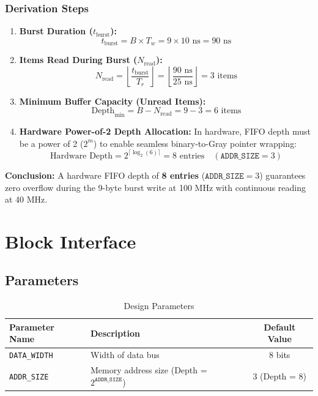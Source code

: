 \documentclass[12pt,a4paper]{article}
\begin{document}
\subsubsection{Derivation Steps}

\begin{enumerate}
    \item \textbf{Burst Duration ($t_{\text{burst}}$):}
    \[
        t_{\text{burst}} = B \times T_w = 9 \times 10\text{ ns} = 90\text{ ns}
    \]

    \item \textbf{Items Read During Burst ($N_{\text{read}}$):}
    \[
        N_{\text{read}} = \left\lfloor \frac{t_{\text{burst}}}{T_r} \right\rfloor = \left\lfloor \frac{90\text{ ns}}{25\text{ ns}} \right\rfloor = 3\text{ items}
    \]

    \item \textbf{Minimum Buffer Capacity (Unread Items):}
    \[
        \text{Depth}_{\text{min}} = B - N_{\text{read}} = 9 - 3 = 6\text{ items}
    \]

    \item \textbf{Hardware Power-of-2 Depth Allocation:}
    In hardware, FIFO depth must be a power of 2 ($2^m$) to enable seamless binary-to-Gray pointer wrapping:
    \[
        \text{Hardware Depth} = 2^{\lceil \log_2(6) \rceil} = 8\text{ entries} \quad (\texttt{ADDR\_SIZE} = 3)
    \]
\end{enumerate}

\textbf{Conclusion:} A hardware FIFO depth of \textbf{8 entries} ($\texttt{ADDR\_SIZE} = 3$) guarantees zero overflow during the 9-byte burst write at 100 MHz with continuous reading at 40 MHz.

\section{Block Interface}

\subsection{Parameters}
\begin{table}[H]
\centering
\begin{tabular}{@{}llc@{}}
\toprule
\textbf{Parameter Name} & \textbf{Description} & \textbf{Default Value} \\
\midrule
\texttt{DATA\_WIDTH} & Width of data bus & 8 bits \\
\texttt{ADDR\_SIZE}  & Memory address size (Depth = $2^{\texttt{ADDR\_SIZE}}$) & 3 (Depth = 8) \\
\bottomrule
\end{tabular}
\caption{Design Parameters}
\end{table}
\end{document}
